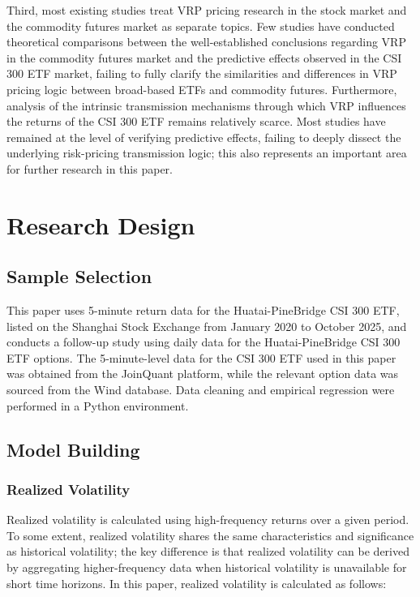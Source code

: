 \documentclass[a4paper, 12pt]{article}    %
\begin{document}
Third, most existing studies treat VRP pricing research in the stock market and the commodity futures market as separate topics. Few studies have conducted theoretical comparisons between the well-established conclusions regarding VRP in the commodity futures market and the predictive effects observed in the CSI 300 ETF market, failing to fully clarify the similarities and differences in VRP pricing logic between broad-based ETFs and commodity futures. Furthermore, analysis of the intrinsic transmission mechanisms through which VRP influences the returns of the CSI 300 ETF remains relatively scarce. Most studies have remained at the level of verifying predictive effects, failing to deeply dissect the underlying risk-pricing transmission logic; this also represents an important area for further research in this paper.


\section{Research Design}

	\subsection{Sample Selection}
	This paper uses 5-minute return data for the Huatai-PineBridge CSI 300 ETF, listed on the Shanghai Stock Exchange from January 2020 to October 2025, and conducts a follow-up study using daily data for the Huatai-PineBridge CSI 300 ETF options.
	The 5-minute-level data for the CSI 300 ETF used in this paper was obtained from the JoinQuant platform, while the relevant option data was sourced from the Wind database. Data cleaning and empirical regression were performed in a Python environment.
    

\subsection{Model Building}
\subsubsection{Realized Volatility}
Realized volatility is calculated using high-frequency returns over a given period. To some extent, realized volatility shares the same characteristics and significance as historical volatility; the key difference is that realized volatility can be derived by aggregating higher-frequency data when historical volatility is unavailable for short time horizons. In this paper, realized volatility is calculated as follows:
\end{document}
